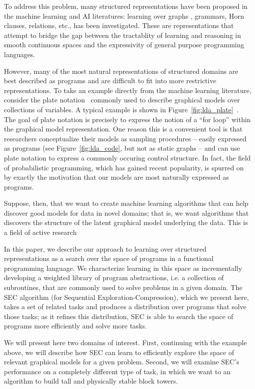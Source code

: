 \documentclass{article} %
\begin{document}
To address this problem, many structured representations have been proposed in the machine learning and AI literatures: learning over graphs \cite{}, grammars\cite{}, Horn clauses\cite{}, relations{}, etc., has been investigated. These are representations that attempt to bridge the gap between the tractablity of learning and reasoning in smooth continuous spaces and the expressivity of general purpose programming languages. 

However, many of the most natural representations of structured domains are best described as programs and are difficult to fit into more restrictive representations.  To take an example directly from the machine learning literature, consider the plate notation~\cite{DBLP:journals/jair/Buntine94} commonly used to describe graphical models over collections of variables. A typical example is shown in Figure~\ref{fig:lda_plate}~\cite{DBLP:journals/jmlr/BleiNJ03}. The goal of plate notation is precisely to express the notion of a ``for loop'' within the graphical model representation. One reason this is a convenient tool is that researchers conceptualize their models as sampling procedures -- easily expressed as programs (see Figure~\ref{fig:lda_code}, but not as static graphs -- and can use plate notation to express a commonly occuring control structure. In fact, the field of probabilistic programming, which has gained recent popularity, is spurred on by exactly the motivation that our models are most naturally expressed as programs. 

Suppose, then, that we want to create machine learning algorithms that can help discover good models for data in novel domains; that is, we want algorithms that discovers the structure of the latent graphical model underlying the data. This is a field of active research \ 

In this paper, we describe our approach to learning over structured representations as a search over the space of programs in a functional programming language. We characterize learning in this space as incrementally developing a weighted library of program abstractions, i.e. a collection of subroutines, that are commonly used to solve problems in a given domain. The SEC algorithm (for Sequential Exploration-Compression), which we present here, takes a set of related tasks and produces a distribution over programs that solve those tasks; as it refines this distribution, SEC is able to search the space of programs more efficiently and solve more tasks. 

We will present here two domains of interest. First, continuing with the example above, we will describe how SEC can learn to efficiently explore the space of relevant graphical models for a given problem. Second, we will examine SEC's performance on a completely different type of task, in which we want to an algorithm to build tall and physically stable block towers. 
\end{document}
